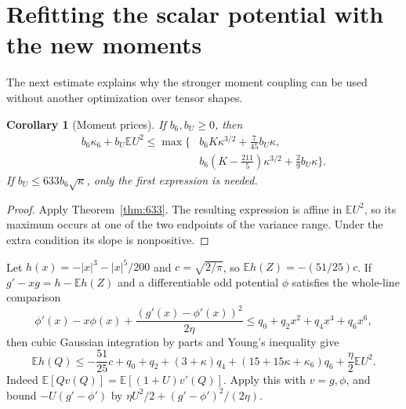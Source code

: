 \documentclass[11pt]{article}
\newtheorem{corollary}{Corollary}
\newcommand{\E}{\mathbb E}
\begin{document}
\section{Refitting the scalar potential with the new moments}
The next estimate explains why the stronger moment coupling can be used without another optimization over tensor shapes.
\begin{corollary}[Moment prices]\label{cor:price}
If $b_6,b_U\ge0$, then
\begin{equation}\label{eq:price}
\begin{aligned}
 b_6\kappa_6+b_U\E U^2\le\max\bigg\{&
 b_6K\kappa^{3/2}+\frac7{45}b_U\kappa,\\
 &b_6\left(K-\frac{211}{5}\right)\kappa^{3/2}
       +\frac29b_U\kappa\bigg\}.
\end{aligned}
\end{equation}
If $b_U\le633b_6\sqrt\kappa$, only the first expression is needed.
\end{corollary}
\begin{proof}
Apply Theorem~\ref{thm:633}. The resulting expression is affine in $\E U^2$, so its maximum occurs at one of the two endpoints of the variance range. Under the extra condition its slope is nonpositive.
\end{proof}

Let $h(x)=-|x|^3-|x|^5/200$ and $c=\sqrt{2/\pi}$, so $\E h(Z)=-(51/25)c$. If $g'-xg=h-\E h(Z)$ and a differentiable odd potential $\phi$ satisfies the whole-line comparison
\begin{equation}\label{eq:stein-majorant}
 \phi'(x)-x\phi(x)+\frac{(g'(x)-\phi'(x))^2}{2\eta}
 \le q_0+q_2x^2+q_4x^4+q_6x^6,
\end{equation}
then cubic Gaussian integration by parts and Young's inequality give
\begin{equation}\label{eq:scalar-price}
 \E h(Q)\le-\frac{51}{25}c+q_0+q_2+(3+\kappa)q_4
 +(15+15\kappa+\kappa_6)q_6+\frac\eta2\E U^2.
\end{equation}
Indeed $\E[Qv(Q)]=\E[(1+U)v'(Q)]$. Apply this with $v=g,\phi$, and bound $-U(g'-\phi')$ by $\eta U^2/2+(g'-\phi')^2/(2\eta)$.
\end{document}

